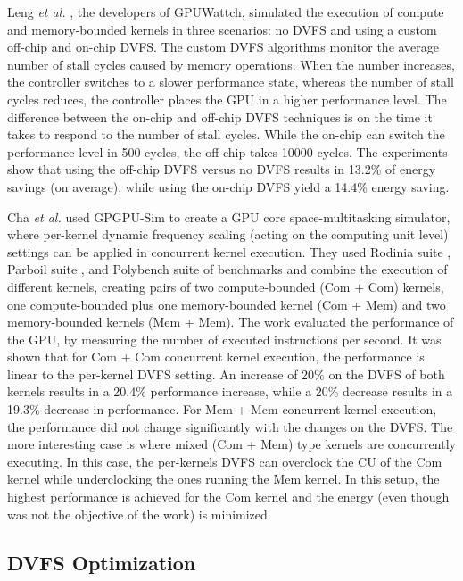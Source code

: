 Leng \textit{et al.} \cite{leng_gpuwattch:_2013}, the developers of GPUWattch, simulated the execution of compute and memory-bounded kernels in three scenarios: no DVFS and using a custom off-chip and on-chip DVFS. The custom DVFS algorithms monitor the average number of stall cycles caused by memory operations. When the number increases, the controller switches to a slower performance state, whereas the number of stall cycles reduces, the controller places the GPU in a higher performance level. The difference between the on-chip and off-chip DVFS techniques is on the time it takes to respond to the number of stall cycles. While the on-chip can switch the performance level in 500 cycles, the off-chip takes 10000 cycles. The experiments show that using the off-chip DVFS versus no DVFS results in 13.2\% of energy savings (on average), while using the on-chip DVFS yield a 14.4\% energy saving.

Cha \textit{et al.} \cite{cha_core-level_2018} used GPGPU-Sim to create a GPU core space-multitasking simulator, where per-kernel dynamic frequency scaling (acting on the computing unit level) settings can be applied in concurrent kernel execution. They used Rodinia suite \cite{che_rodinia:_2009}, Parboil suite \cite{stratton_parboil:_nodate}, and Polybench suite \cite{noauthor_polybench/c_nodate} of benchmarks and combine the execution of different kernels, creating pairs of two compute-bounded (Com + Com) kernels, one compute-bounded plus one memory-bounded kernel (Com + Mem) and two memory-bounded kernels (Mem + Mem). The work evaluated the performance of the GPU, by measuring the number of executed instructions per second. It was shown that for Com + Com concurrent kernel execution, the performance is linear to the per-kernel DVFS setting. An increase of 20\% on the DVFS of both kernels results in a 20.4\% performance increase, while a 20\% decrease results in a 19.3\% decrease in performance. For Mem + Mem concurrent kernel execution, the performance did not change significantly with the changes on the DVFS. The more interesting case is where mixed (Com + Mem) type kernels are concurrently executing. In this case, the per-kernels DVFS can overclock the CU of the Com kernel while underclocking the ones running the Mem kernel. In this setup, the highest performance is achieved for the Com kernel and the energy (even though was not the objective of the work) is minimized.

\subsection{DVFS Optimization}

